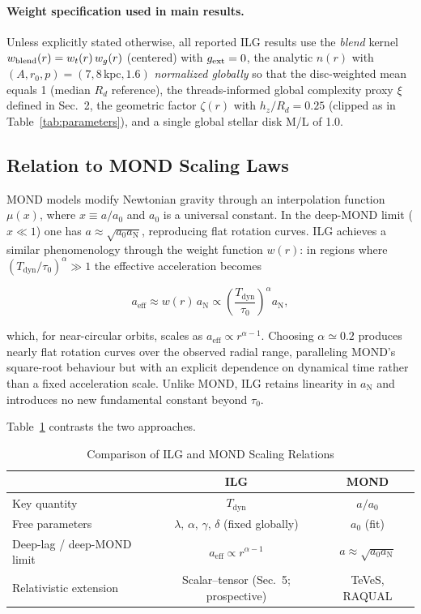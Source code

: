 \documentclass[12pt,a4paper]{article}
\begin{document}
\paragraph{Weight specification used in main results.} Unless explicitly stated otherwise, all reported ILG results use the \emph{blend} kernel $w_{\rm blend}(r)=w_t(r)\,w_g(r)$ (centered) with $g_{\rm ext}=0$, the analytic $n(r)$ with $(A,r_0,p)=(7,8\,\mathrm{kpc},1.6)$ \emph{normalized globally} so that the disc-weighted mean equals 1 (median $R_d$ reference), the threads-informed global complexity proxy $\xi$ defined in Sec.~2, the geometric factor $\zeta(r)$ with $h_z/R_d=0.25$ (clipped as in Table~\ref{tab:parameters}), and a single global stellar disk M/L of 1.0.

\subsection{Relation to MOND Scaling Laws}

MOND models modify Newtonian gravity through an interpolation function $\mu(x)$, where $x \equiv a/a_0$ and $a_0$ is a universal constant.  In the deep-MOND limit ($x \ll 1$) one has $a \approx \sqrt{a_0 a_\mathrm{N}}$, reproducing flat rotation curves.  ILG achieves a similar phenomenology through the weight function $w(r)$: in regions where $(T_\mathrm{dyn}/\tau_0)^\alpha \gg 1$ the effective acceleration becomes

\begin{equation}
a_\mathrm{eff} \approx w(r) \, a_\mathrm{N} \propto \left(\frac{T_\mathrm{dyn}}{\tau_0}\right)^\alpha a_\mathrm{N},
\end{equation}

which, for near-circular orbits, scales as $a_\mathrm{eff} \propto r^{\alpha-1}$.  Choosing $\alpha \simeq 0.2$ produces nearly flat rotation curves over the observed radial range, paralleling MOND's square-root behaviour but with an explicit dependence on dynamical time rather than a fixed acceleration scale.  Unlike MOND, ILG retains linearity in $a_\mathrm{N}$ and introduces no new fundamental constant beyond $\tau_0$.

Table~\ref{tab:mond_compare} contrasts the two approaches.

\begin{table}[h]
\centering
\caption{Comparison of ILG and MOND Scaling Relations}
\label{tab:mond_compare}
\begin{tabular}{l c c}
\toprule
 & ILG & MOND \\
\midrule
Key quantity & $T_\mathrm{dyn}$ & $a/a_0$ \\
Free parameters & $\lambda,\,\alpha,\,\gamma,\,\delta$ (fixed globally) & $a_0$ (fit) \\
Deep-lag / deep-MOND limit & $a_\mathrm{eff} \propto r^{\alpha-1}$ & $a \approx \sqrt{a_0 a_\mathrm{N}}$ \\
Relativistic extension & Scalar–tensor (Sec.~5; prospective) & TeVeS, RAQUAL \\
\bottomrule
\end{tabular}
\end{table}
\end{document}
